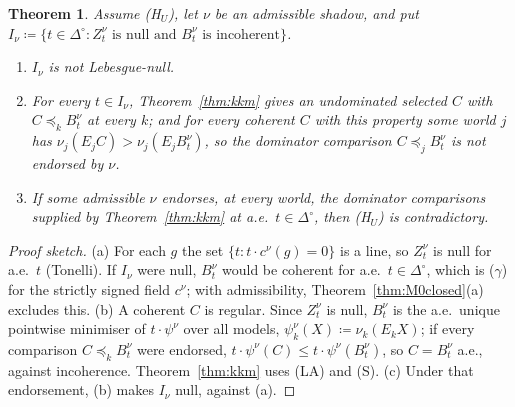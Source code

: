 \documentclass[11pt]{article}
\newtheorem{theorem}{Theorem}[section]
\theoremstyle{definition}
\theoremstyle{remark}
\newcommand{\Di}{\Delta^{\circ}}
\begin{document}
\begin{theorem}\label{thm:E11}
Assume (H$_U$), let $\nu$ be an admissible shadow, and put $I_\nu\coloneqq\{t\in\Di:Z^\nu_t\text{ is null and }B^\nu_t\text{ is incoherent}\}$.
\begin{enumerate}[leftmargin=*,label=(\alph*)]
\item $I_\nu$ is not Lebesgue-null.
\item For every $t\in I_\nu$, Theorem~\ref{thm:kkm} gives an undominated selected $C$ with $C\preceq_kB^\nu_t$ at every $k$; and for every coherent $C$ with this property some world $j$ has $\nu_j(E_jC)>\nu_j(E_jB^\nu_t)$, so the dominator comparison $C\preceq_jB^\nu_t$ is not endorsed by $\nu$.
\item If some admissible $\nu$ endorses, at every world, the dominator comparisons supplied by Theorem~\ref{thm:kkm} at a.e.\ $t\in\Di$, then (H$_U$) is contradictory.
\end{enumerate}
\end{theorem}
\begin{proof}[Proof sketch]
(a) For each $g$ the set $\{t:t\cdot c^\nu(g)=0\}$ is a line, so $Z^\nu_t$ is null for a.e.\ $t$ (Tonelli). If $I_\nu$ were null, $B^\nu_t$ would be coherent for a.e.\ $t\in\Di$, which is ($\gamma$) for the strictly signed field $c^\nu$; with admissibility, Theorem~\ref{thm:M0closed}(a) excludes this. (b) A coherent $C$ is regular. Since $Z^\nu_t$ is null, $B^\nu_t$ is the a.e.\ unique pointwise minimiser of $t\cdot\psi^\nu$ over all models, $\psi^\nu_k(X)\coloneqq\nu_k(E_kX)$; if every comparison $C\preceq_kB^\nu_t$ were endorsed, $t\cdot\psi^\nu(C)\le t\cdot\psi^\nu(B^\nu_t)$, so $C=B^\nu_t$ a.e., against incoherence. Theorem~\ref{thm:kkm} uses (LA) and (S). (c) Under that endorsement, (b) makes $I_\nu$ null, against (a).
\end{proof}
\end{document}
